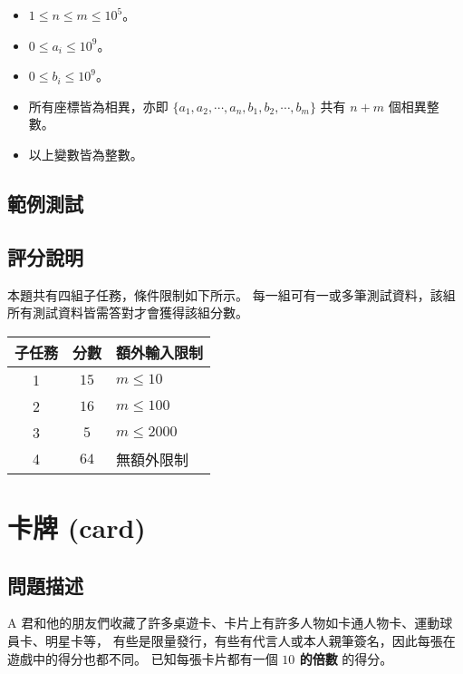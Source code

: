 \begin{itemize}
\tightlist
\item
  \(1 \le n \le m \le 10^5\)。
\item
  \(0 \le a_i \le 10^9\)。
\item
  \(0 \le b_i \le 10^9\)。
\item
  所有座標皆為相異，亦即
  \(\{a_1, a_2, \cdots, a_n, b_1, b_2, \cdots, b_m\}\) 共有 \(n+m\)
  個相異整數。
\item
  以上變數皆為整數。
\end{itemize}

\subsection{範例測試}

\begin{example}
%
%
\end{example}

\subsection{評分說明}

本題共有四組子任務，條件限制如下所示。
每一組可有一或多筆測試資料，該組所有測試資料皆需答對才會獲得該組分數。

\begin{longtable}[]{@{}ccl@{}}
\toprule
子任務 & 分數 & 額外輸入限制 \\
\midrule
\endhead
1 & \(15\) & \(m \le 10\) \\
2 & \(16\) & \(m \le 100\) \\
3 & \(5\) & \(m \le 2000\) \\
4 & \(64\) & 無額外限制 \\
\bottomrule
\end{longtable}

\section{卡牌 (card)}

\subsection{問題描述}

A
君和他的朋友們收藏了許多桌遊卡、卡片上有許多人物如卡通人物卡、運動球員卡、明星卡等，
有些是限量發行，有些有代言人或本人親筆簽名，因此每張在遊戲中的得分也都不同。
已知每張卡片都有一個 \textbf{\(10\) 的倍數} 的得分。

